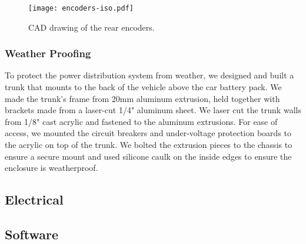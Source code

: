 \begin{figure}[ht!]
  \centering
  \texttt{[image: encoders-iso.pdf]}
  \caption{CAD drawing of the rear encoders.}
\end{figure}

\subsubsection{Weather Proofing}

To protect the power distribution system from weather, we designed and
built a trunk that mounts to the back of the vehicle above the car
battery pack. We made the trunk's frame from 20mm aluminum extrusion,
held together with brackets made from a laser-cut 1/4" aluminum sheet.
We laser cut the trunk walls from 1/8" cast acrylic and fastened to the
aluminum extrusions. For ease of access, we mounted the circuit
breakers and under-voltage protection boards to the acrylic on top of
the trunk. We bolted the extrusion pieces to the chassis to ensure a
secure mount and used silicone caulk on the inside edges to ensure the
enclosure is weatherproof.

\newpage

\subsection{Electrical}

\subsection{Software}
